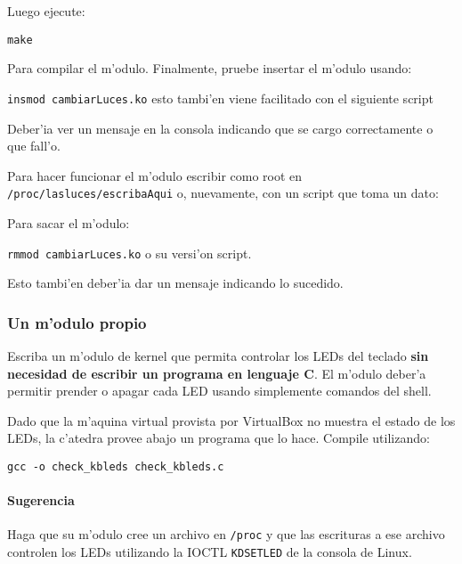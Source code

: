 Luego ejecute:

\texttt{make}

Para compilar el m'odulo. Finalmente, pruebe insertar el m'odulo usando:

\texttt{insmod cambiarLuces.ko} esto tambi'en viene facilitado con el siguiente script

Deber'ia ver un mensaje en la consola indicando que se cargo correctamente o que fall'o.

Para hacer funcionar el m'odulo escribir como root en \texttt{/proc/lasluces/escribaAqui} o, nuevamente, con un script que toma un dato:


Para sacar el m'odulo:

\texttt{rmmod cambiarLuces.ko} o su versi'on script.


Esto tambi'en deber'ia dar un mensaje indicando lo sucedido.

\subsubsection{Un m'odulo propio}

Escriba un m'odulo de kernel que permita controlar los LEDs del teclado \textbf{sin necesidad de escribir un programa
en lenguaje C}. El m'odulo deber'a permitir prender o apagar cada LED usando simplemente comandos del shell.

Dado que la m'aquina virtual provista por VirtualBox no muestra el estado de los LEDs, la c'atedra provee abajo
un programa que lo hace. Compile utilizando:

\texttt{gcc -o check\_kbleds check\_kbleds.c}


\paragraph{Sugerencia}

Haga que su m'odulo cree un archivo en \texttt{/proc} y que las escrituras a ese archivo controlen los LEDs utilizando
la IOCTL \texttt{KDSETLED} de la consola de Linux.
